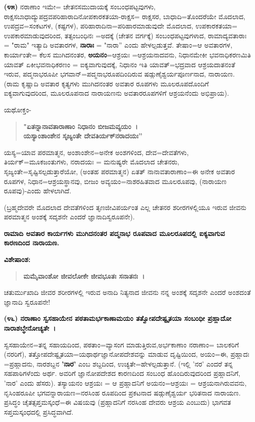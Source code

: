 \textbf{(೪೫)} ನರಾಣಾಂ ಇಮೇ= ಚೇತನಸಮುದಾಯಕ್ಕೆ ಸಂಬಂಧಪಟ್ಟವುಗಳು, ರಾಕ್ಷಸ\-ಬಾಧಾದ್ಯುಪದ್ರವಪರಿಹಾರಾದಿನೋಪಕಾರಕತಯಾ-ರಾಕ್ಷಸ= ರಾಕ್ಷಸರ, ಬಾಧಾದಿ=\break ತೊಂದರೆಯೇ ಮೊದಲಾದ, ಉಪದ್ರವ=ಸಂಕಟಗಳ, (ಕಷ್ಟಗಳ), ಪರಿಹಾರಾದಿನಾ=ಪರಿಹಾರ\-ಮಾಡುವುದೇ ಮೊದಲಾದ, ಉಪಕಾರಕತಯಾ= ಉಪಕಾರಮಾಡುವುದರಿಂದ, ತತ್ಸಂಬಂಧಿನಃ =ಅದಕ್ಕೆ (ಚೇತನ ವರ್ಗಕ್ಕೆ) ಸಂಬಂಧಪಟ್ಟವುಗಳಾದ, ರಾಮಾದ್ಯವತಾರಾಃ = "ರಾಮ" ಇತ್ಯಾದಿ ಅವತಾರಗಳ, \textbf{ನಾರಾಃ} = "ನಾರಾ'' ಎಂದು ಹೇಳಲ್ಪಡುತ್ತವೆ. ತೇಷಾಂ=ಆ ಅವತಾರಗಳ, ಕಾರ್ಯಾಂತೇ= ಕೆಲಸ ಮುಗಿದನಂತರ, \textbf{ಅಯನಂ}=ಆಶ್ರಯಃ =ಆಶ್ರಯನಾದವನು, ನಿಧಾನಮೇಕೀ ಭವನಾಧಿಕರಣಮಿತಿ ಯಾವತ್‌ ಏಕೀಭವನಾಧಿಕರಣಂ = ಐಕ್ಯವಾಗುವುದಕ್ಕೆ, ನಿಧಾನಂ ಇತಿ ಯಾವತ್=ಭದ್ರವಾದ ಆಶ್ರಯದಾತನಂತೆ ಇರುವ, ಪದ್ಮನಾಭರೂಪೀ ಭಗವಾನ್=ಪದ್ಮನಾಭರೂಪದಿಂದಿರುವ ಷಡ್ಗುಣೈಶ್ವರ್ಯಪೂರ್ಣನಾದ, ನಾರಾಯಣ. (ರಾಮ ಕೃಷ್ಣಾದಿ ಅವತಾರ ಕೃತ್ಯಗಳು ಮುಗಿದನಂತರ ಅವತಾರ ರೂಪಗಳು ಮೂಲರೂಪದೊಂದಿಗೆ ಐಕ್ಯವಾಗುವುದರಿಂದ, ಮೂಲರೂಪನಾದ ನಾರಾಯಣನು ಅವತಾರರೂಪಗಳಿಗೆ ಆಶ್ರಯನೆಂದು ಅಭಿಪ್ರಾಯ).

ಯಥೋಕ್ತಂ-

\begin{verse}
\textbf{"ಏತನ್ನಾನಾವತಾರಾಣಾಂ ನಿಧಾನಂ ಬೀಜಮವ್ಯಯಂ~।}\\\textbf{ಯಸ್ಯಾಂಶಾಂಶೇನ ಸೃಜ್ಯಂತೇ ದೇವತಿರ್ಯಕ್‌ನರಾದಯಃ''}
\end{verse}

ಯಸ್ಯ=ಯಾವ ಪರಮಾತ್ಮನ, ಅಂಶಾಂಶೇನ=ಅನೇಕ ಅಂಶಗಳಿಂದ, ದೇವ=ದೇವತೆಗಳು, ತಿರ್ಯಕ್=ಮೂಕಜಂತುಗಳು, ನರಾದಯಃ = ಮನುಷ್ಯರೇ ಮೊದಲಾದ ಚೇತನರು, ಸೃಜ್ಯಂತೇ=ಸೃಷ್ಟಿಸಲ್ಪಡುತ್ತಾರೆಯೋ, (ಅಂತಹ ಪರಮಾತ್ಮನ) ಏತತ್ ನಾನಾವತಾರಾಣಾಂ=ಈ ಅನೇಕ ಅವತಾರ ರೂಪಗಳ, ನಿಧಾನ=ಆಶ್ರಯಸ್ಥಾನವು, ಬೀಜಂ ಅವ್ಯಯಂ=ನಾಶರಹಿತವಾದ ಮೂಲರೂಪವು, (ನಾರಾಯಣ ರೂಪವು)-ಎಂದು ಹೇಳಲಾಗಿದೆ.

(ಬ್ರಹ್ಮದೇವರೇ ಮೊದಲಾದ ದೇವತೆಗಳಿಂದ ತೃಣಜೀವಿಪರ್ಯಂತ ಎಲ್ಲ ಚೇತನರ ಶರೀರಗಳಲ್ಲಿಯೂ ಇರುವ ಜೀವನು ಪರಮಾತ್ಮನ ಅಂಶಕ್ಕೆ ಸದೃಶನೇ ಎಂದರೆ ಜ್ಞಾನಾದಿ\-ಸ್ವರೂಪನೇ).

\begin{center}
\textbf{ರಾಮಾದಿ ಅವತಾರ ಕಾರ್ಯಗಳು ಮುಗಿದನಂತರ ಪದ್ಮನಾಭ ರೂಪವಾದ ಮೂಲರೂಪದಲ್ಲಿ ಐಕ್ಯವಾಗುವ ಕಾರಣದಿಂದ ನಾರಾಯಣ.}
\end{center}

\noindent
\textbf{ವಿಶೇಷಾಂಶ:\enginline{-}}

\begin{verse}
\textbf{ಮಮೈವಾಂಶೋ ಜೀವಲೋಕೇ ಜೀವಭೂತಃ ಸನಾತನಃ~।}
\end{verse}


ಚತುರ್ಮುಖಾದಿ ಜೀವರ ಶರೀರಗಳಲ್ಲಿ ಇರುವ ಅನಾದಿ ನಿತ್ಯನಾದ ಜೀವನು ನನ್ನ ಅಂಶಕ್ಕೆ ಸದೃಶನೇ ಎಂದರೆ ಅಂಶದಂತೆ ಜ್ಞಾನಾದಿ ಸ್ವರೂಪನೇ!

\textbf{(೪೬) ನರಾಣಾಂ ಸ್ವಸಹಾಯೇನ ಪಠತಾಮರ್ಭಕಾಣಾಮಯಂ ತತ್ವೋಪದೇಷ್ಟೃತಯಾ ಸಂಬಂಧೀ ಪ್ರಹ್ಲಾದೋ ನಾರಾಶಬ್ಧೇನೋಚ್ಯತೇ~।}

ಸ್ವಸಹಾಯೇನ=ತನ್ನ ಸಹಾಯದಿಂದ, ಪಠತಾಂ=ವ್ಯಾಸಂಗ ಮಾಡುತ್ತಿರುವ,\break ಅರ್ಭಕಾಣಾಂ ನರಾಣಾಂ= ಬಾಲಕರಿಗೆ (ನರರಿಗೆ), ತತ್ತೋಪದೇಷ್ಟೃತಯಾ=ಯಥಾರ್ಥ\-ಜ್ಞಾನೋಪದೇಶವನ್ನು ಮಾಡುವ ದೃಷ್ಟಿಯಿಂದ, ಅಯಂ=ಈ, ಪ್ರಹ್ಲಾದಃ =ಪ್ರಹ್ಲಾದನು, ನಾರಶಬ್ದನ \textbf{'ನಾರ'} ಎಂಬ ಶಬ್ದದಿಂದ, ಉಚ್ಯತೇ=ಹೇಳಲ್ಪಡುತ್ತಾನೆ. (ಇಲ್ಲಿ 'ನರ' ಎಂದರೆ ತನ್ನ ಸಹಪಾಠಿಗಳೆಂದು ಅರ್ಥ. ಅವರಿಗೆ ಜ್ಞಾನೋಪದೇಶದ ಕಾರಣದಿಂದ ಸಂಬಂಧ ಹೊಂದಿರುವುದರಿಂದ ಪ್ರಹ್ಲಾದನಿಗೆ, 'ನಾರ' ಎಂದು ಹೆಸರು). ತಸ್ಯಾಯನಂ ಆಶ್ರಯಃ = ಆ ಪ್ರಹ್ಲಾದನಿಗೆ ಅಯನಂ=ಆಶ್ರಯಃ = ಆಶ್ರಯನಾಗಿರುವವನು, ನೃಸಿಂಹರೂಪೀ ಭಗವನ್ನಾರಾಯಣ=ನರಸಿಂಹ ರೂಪದಿಂದ ಪ್ರಕಟನಾದ ಷಡ್ಗುಣೈಶ್ವರ್ಯ ಭರಿತನಾದ ನಾರಾಯಣ. ಪ್ರಸಿದ್ಧಂ ಚೈತತ್ಸಪ್ತಮಸ್ಕಂಧೆ=ಈ ವಿಷಯವು (ಪ್ರಹ್ಲಾದನಿಗೆ ನರಸಿಂಹ ದೇವರು ಆಶ್ರಯ ಎಂಬುದು) ಭಾಗವತ ಸಪ್ತಮಸ್ಕಂಧದಲ್ಲಿ ಪ್ರಸಿದ್ಧವಾಗಿದೆ.

